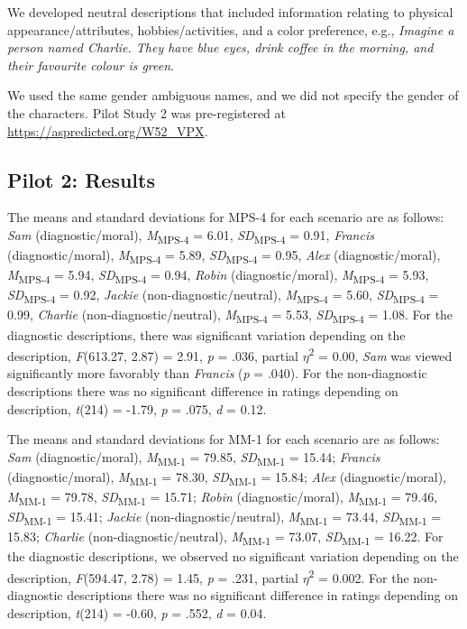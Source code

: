 \documentclass[
  english,
  man,floatsintext]{apa7}
\begin{document}
We developed neutral descriptions that included information relating to physical appearance/attributes, hobbies/activities, and a color preference, e.g., \emph{Imagine a person named Charlie. They have blue eyes, drink coffee in the morning, and their favourite colour is green}.

We used the same gender ambiguous names, and we did not specify the gender of the characters. Pilot Study 2 was pre-registered at \color{blue}\url{https://aspredicted.org/W52_VPX}\color{black}.

\hypertarget{pilot-2-results}{%
\subsection{Pilot 2: Results}\label{pilot-2-results}}

The means and standard deviations for MPS-4 for each scenario are as follows:
\emph{Sam} (diagnostic/moral),
\emph{M}\textsubscript{MPS-4} = 6.01, \emph{SD}\textsubscript{MPS-4} = 0.91,
\emph{Francis} (diagnostic/moral),
\emph{M}\textsubscript{MPS-4} = 5.89, \emph{SD}\textsubscript{MPS-4} = 0.95,
\emph{Alex} (diagnostic/moral),
\emph{M}\textsubscript{MPS-4} = 5.94, \emph{SD}\textsubscript{MPS-4} = 0.94,
\emph{Robin} (diagnostic/moral),
\emph{M}\textsubscript{MPS-4} = 5.93, \emph{SD}\textsubscript{MPS-4} = 0.92,
\emph{Jackie} (non-diagnostic/neutral),
\emph{M}\textsubscript{MPS-4} = 5.60, \emph{SD}\textsubscript{MPS-4} = 0.99,
\emph{Charlie} (non-diagnostic/neutral),
\emph{M}\textsubscript{MPS-4} = 5.53, \emph{SD}\textsubscript{MPS-4} = 1.08. For the diagnostic descriptions, there was significant variation depending on the description, \emph{F}(613.27, 2.87) = 2.91, \emph{p} = .036, partial \(\eta\)\textsuperscript{2} = 0.00, \emph{Sam} was viewed significantly more favorably than \emph{Francis} (\emph{p} = .040). For the non-diagnostic descriptions there was no significant difference in ratings depending on description, \emph{t}(214) = -1.79, \emph{p} = .075, \emph{d} = 0.12.

The means and standard deviations for MM-1 for each scenario are as follows:
\emph{Sam} (diagnostic/moral),
\emph{M}\textsubscript{MM-1} = 79.85, \emph{SD}\textsubscript{MM-1} = 15.44;
\emph{Francis} (diagnostic/moral),
\emph{M}\textsubscript{MM-1} = 78.30, \emph{SD}\textsubscript{MM-1} = 15.84;
\emph{Alex} (diagnostic/moral),
\emph{M}\textsubscript{MM-1} = 79.78, \emph{SD}\textsubscript{MM-1} = 15.71;
\emph{Robin} (diagnostic/moral),
\emph{M}\textsubscript{MM-1} = 79.46, \emph{SD}\textsubscript{MM-1} = 15.41;
\emph{Jackie} (non-diagnostic/neutral),
\emph{M}\textsubscript{MM-1} = 73.44, \emph{SD}\textsubscript{MM-1} = 15.83;
\emph{Charlie} (non-diagnostic/neutral),
\emph{M}\textsubscript{MM-1} = 73.07, \emph{SD}\textsubscript{MM-1} = 16.22. For the diagnostic descriptions, we observed no significant variation depending on the description, \emph{F}(594.47, 2.78) = 1.45, \emph{p} = .231, partial \(\eta\)\textsuperscript{2} = 0.002. For the non-diagnostic descriptions there was no significant difference in ratings depending on description, \emph{t}(214) = -0.60, \emph{p} = .552, \emph{d} = 0.04.
\end{document}
